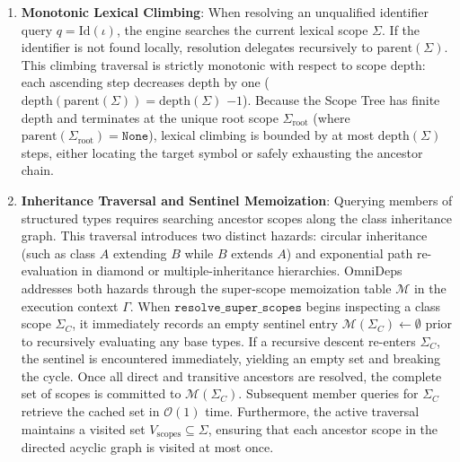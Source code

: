 \begin{enumerate}
  \item \textbf{Monotonic Lexical Climbing}: When resolving an unqualified
    identifier query $q = \text{Id}(\iota)$, the engine searches the current
    lexical scope $\Sigma$. If the identifier is not found locally, resolution
    delegates recursively to $\text{parent}(\Sigma)$. This climbing traversal
    is strictly monotonic with respect to scope depth: each ascending step
    decreases depth by one ($\text{depth}(\text{parent}(\Sigma)) =
    \text{depth}(\Sigma)$ $- 1$).
    Because the Scope Tree has finite depth and terminates at the unique root
    scope $\Sigma_{\text{root}}$ (where
    $\text{parent}(\Sigma_{\text{root}}) = \texttt{None}$),
    lexical climbing is bounded by at most $\text{depth}(\Sigma)$ steps, either
    locating the target symbol or safely exhausting the ancestor chain.

  \item \textbf{Inheritance Traversal and Sentinel Memoization}: Querying
    members of structured types requires searching ancestor scopes along the
    class inheritance graph. This traversal introduces two distinct hazards:
    circular inheritance (such as class $A$ extending $B$ while $B$ extends $A$)
    and exponential path re-evaluation in diamond or multiple-inheritance
    hierarchies. OmniDeps addresses both hazards through the super-scope
    memoization table $\mathcal{M}$ in the execution context $\Gamma$. When
    $\texttt{resolve\_super\_scopes}$ begins inspecting a class scope
    $\Sigma_C$,
    it immediately records an empty sentinel entry
    $\mathcal{M}(\Sigma_C) \leftarrow \emptyset$
    prior to recursively evaluating any base types. If a recursive descent
    re-enters $\Sigma_C$, the sentinel is encountered immediately, yielding an
    empty set and breaking the cycle. Once all direct and transitive ancestors
    are resolved, the complete set of scopes is committed to
    $\mathcal{M}(\Sigma_C)$.
    Subsequent member queries for $\Sigma_C$ retrieve the cached set
    in $\mathcal{O}(1)$
    time. Furthermore, the active traversal maintains a visited set
    $V_{\text{scopes}} \subseteq \Sigma$, ensuring that each ancestor scope in
    the directed acyclic graph is visited at most once.


\end{enumerate}
